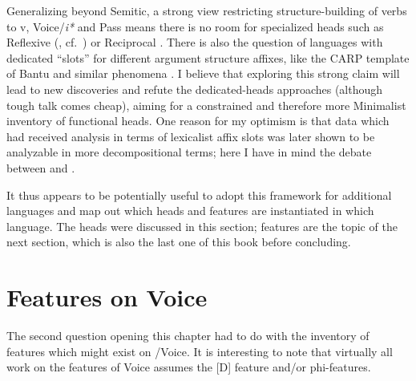 \begin{exe}
\begin{xlist}
\begin{xlist}
\begin{xlist}
\begin{xlist}
\begin{xlist}
\begin{xlist}
\begin{exe}
\begin{xlist}
\begin{exe}
\begin{exe}
\begin{xlist}
\begin{exe}
\begin{exe}
\begin{xlist}
\begin{exe}
\begin{xlist}
\begin{exe}
\begin{xlist}
\begin{exe}
\begin{xlist}
\begin{exe}
\begin{xlist}
\label{r1:6:5}Generalizing beyond Semitic, a strong view restricting structure-building of verbs to v, Voice/\textit{i*} and Pass means there is no room for specialized heads such as Reflexive (\citealt{ahn15phd}, cf.~\citealt{spathas17camvoice,spathas17debrecen}) or Reciprocal \citep{bruening04}. There is also the question of languages with dedicated ``slots'' for different argument structure affixes, like the CARP template of Bantu and similar phenomena \citep{hyman03,paster05}. I believe that exploring this strong claim will lead to new discoveries and refute the dedicated-heads approaches (although tough talk comes cheap), aiming for a constrained and therefore more Minimalist inventory of functional heads. One reason for my optimism is that data which had received analysis in terms of lexicalist affix slots was later shown to be analyzable in more decompositional terms; here I have in mind the  debate between \cite{inkelas93} and \cite{noyer98}.

It thus appears to be potentially useful to adopt this framework for additional languages and map out which heads and features are instantiated in which language. The heads were discussed in this section; features are the topic of the next section, which is also the last one of this book before concluding.


\section{Features on Voice} \label{i:agree}
The second question opening this chapter had to do with the inventory of features which might exist on \textit{}/Voice. It is interesting to note that virtually all work on the features of Voice assumes the [D] feature and/or phi-features.


\end{xlist}
\end{exe}
\end{xlist}
\end{exe}
\end{xlist}
\end{exe}
\end{xlist}
\end{exe}
\end{xlist}
\end{exe}
\end{exe}
\end{xlist}
\end{exe}
\end{exe}
\end{xlist}
\end{exe}
\end{xlist}
\end{xlist}
\end{xlist}
\end{xlist}
\end{xlist}
\end{xlist}
\end{exe}
